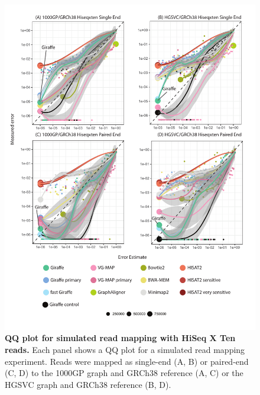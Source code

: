 \documentclass[11pt]{ucscthesis}
\begin{document}
\begin{figure}[H]
    \centering
    \includegraphics[width=.8\linewidth]{aim2_supplement_hiseqxten-qq.pdf}
    \caption[QQ plot for simulated read mapping with HiSeq X Ten reads]{\textbf{QQ plot for simulated read mapping with HiSeq X Ten reads.} Each panel shows a QQ plot for a simulated read mapping experiment. Reads were mapped as single-end (A, B) or paired-end (C, D) to the 1000GP graph and GRCh38 reference (A, C) or the HGSVC graph and GRCh38 reference (B, D).}
    \label{fig:aim2_supplement_hiseqxten_qq}
\end{figure}
\end{document}
